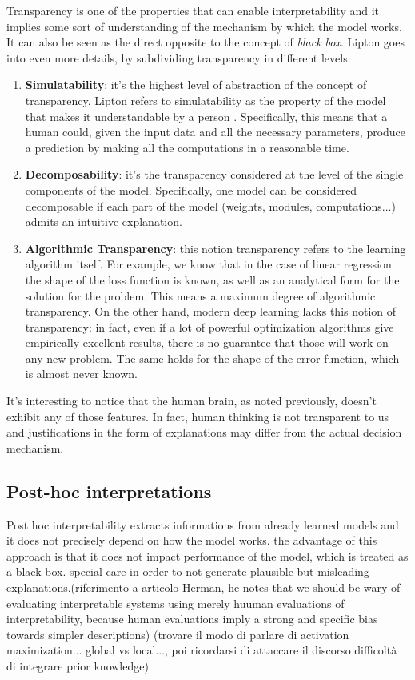 Transparency is one of the properties that can enable interpretability and it implies some sort of understanding of the mechanism by which the model works. It can also be seen as the direct opposite to the concept of \textit{black box}. Lipton \cite{lipton2017mythos} goes into even more details, by subdividing transparency in different levels:
\begin{enumerate}
	\item \textbf{Simulatability}: it's the highest level of abstraction of the concept of transparency. Lipton refers to simulatability as the property of the model that makes it understandable by a person . Specifically, this means that a human could, given the input data and all the necessary parameters, produce a prediction by making all the computations in a reasonable time. 
	\item \textbf{Decomposability}: it's the transparency considered at the level of the single components of the model. Specifically, one model can be considered decomposable if each part of the model (weights, modules, computations...) admits an intuitive explanation.
	\item \textbf{Algorithmic Transparency}: this notion transparency refers to the learning algorithm itself. For example, we know that in the case of linear regression the shape of the loss function is known, as well as an analytical form for the solution for the problem. This means a maximum degree of algorithmic transparency. On the other hand, modern deep learning lacks this notion of transparency: in fact, even if a lot of powerful optimization algorithms give empirically excellent results, there is no guarantee that those will work on any new problem. The same holds for the shape of the error function, which is almost never known.
\end{enumerate}

It's interesting to notice that the human brain, as noted previously, doesn't exhibit any of those features. In fact, human thinking is not transparent to us and justifications in the form of explanations may differ from the actual decision mechanism.

\subsection{Post-hoc interpretations}


Post hoc interpretability extracts informations from already learned models and it does not precisely depend on how the model works. the advantage of this approach is that it does not impact performance of the model, which is treated as a black box. special care in order to not generate plausible but misleading explanations.(riferimento a articolo Herman, he notes that we should be wary of evaluating interpretable systems using merely huuman evaluations of interpretability, because human evaluations imply a strong and specific bias towards simpler descriptions)
(trovare il modo di parlare di activation maximization... global vs local..., poi ricordarsi di attaccare il discorso difficoltà di integrare prior knowledge)



